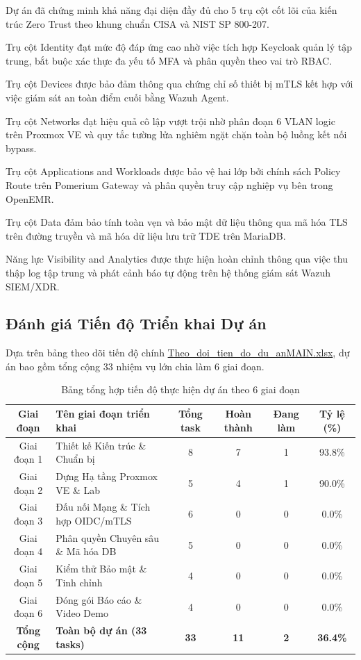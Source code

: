 Dự án đã chứng minh khả năng đại diện đầy đủ cho 5 trụ cột cốt lõi của kiến trúc Zero Trust theo khung chuẩn CISA và NIST SP 800-207.

Trụ cột Identity đạt mức độ đáp ứng cao nhờ việc tích hợp Keycloak quản lý tập trung, bắt buộc xác thực đa yếu tố MFA và phân quyền theo vai trò RBAC.

Trụ cột Devices được bảo đảm thông qua chứng chỉ số thiết bị mTLS kết hợp với việc giám sát an toàn điểm cuối bằng Wazuh Agent.

Trụ cột Networks đạt hiệu quả cô lập vượt trội nhờ phân đoạn 6 VLAN logic trên Proxmox VE và quy tắc tường lửa nghiêm ngặt chặn toàn bộ luồng kết nối bypass.

Trụ cột Applications and Workloads được bảo vệ hai lớp bởi chính sách Policy Route trên Pomerium Gateway và phân quyền truy cập nghiệp vụ bên trong OpenEMR.

Trụ cột Data đảm bảo tính toàn vẹn và bảo mật dữ liệu thông qua mã hóa TLS trên đường truyền và mã hóa dữ liệu lưu trữ TDE trên MariaDB.

Năng lực Visibility and Analytics được thực hiện hoàn chỉnh thông qua việc thu thập log tập trung và phát cảnh báo tự động trên hệ thống giám sát Wazuh SIEM/XDR.

\subsection{Đánh giá Tiến độ Triển khai Dự án}

Dựa trên bảng theo dõi tiến độ chính \url{Theo_doi_tien_do_du_anMAIN.xlsx}, dự án bao gồm tổng cộng 33 nhiệm vụ lớn chia làm 6 giai đoạn.

\begin{table}[H]
\centering
\caption{Bảng tổng hợp tiến độ thực hiện dự án theo 6 giai đoạn}
\label{tab:project_progress}
\begin{tabular}{| c | p{4.5cm} | c | c | c | c |}
\hline
\textbf{Giai đoạn} & \textbf{Tên giai đoạn triển khai} & \textbf{Tổng task} & \textbf{Hoàn thành} & \textbf{Đang làm} & \textbf{Tỷ lệ (\%)} \\ \hline
Giai đoạn 1 & Thiết kế Kiến trúc \& Chuẩn bị & 8 & 7 & 1 & 93.8\% \\ \hline
Giai đoạn 2 & Dựng Hạ tầng Proxmox VE \& Lab & 5 & 4 & 1 & 90.0\% \\ \hline
Giai đoạn 3 & Đấu nối Mạng \& Tích hợp OIDC/mTLS & 6 & 0 & 0 & 0.0\% \\ \hline
Giai đoạn 4 & Phân quyền Chuyên sâu \& Mã hóa DB & 5 & 0 & 0 & 0.0\% \\ \hline
Giai đoạn 5 & Kiểm thử Bảo mật \& Tinh chỉnh & 4 & 0 & 0 & 0.0\% \\ \hline
Giai đoạn 6 & Đóng gói Báo cáo \& Video Demo & 4 & 0 & 0 & 0.0\% \\ \hline
\textbf{Tổng cộng} & \textbf{Toàn bộ dự án (33 tasks)} & \textbf{33} & \textbf{11} & \textbf{2} & \textbf{36.4\%} \\ \hline
\end{tabular}
\end{table}

